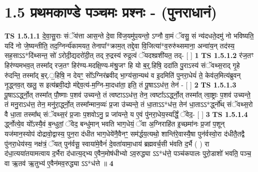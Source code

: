 \documentclass[17pt]{extarticle}
\begin{document}
     \section*{ 1.5     प्रथमकाण्डे पञ्चमः प्रश्नः - (पुनराधानं) }
                                        \textbf{ TS 1.5.1.1} \newline
                  दे॒वा॒सु॒राः संॅय॑त्ता आस॒न्ते दे॒वा वि॑ज॒यमु॑प॒यन्तो॒ ऽग्नौ वा॒मं ॅवसु॒ सं न्य॑दधते॒दमु॑ नो भविष्यति॒ यदि॑ नो जे॒ष्यन्तीति॒ तद॒ग्निर्न्य॑कामयत॒ तेनापा᳚*क्राम॒त् तद्दे॒वा वि॒जित्या॑*व॒रुरु॑थ्समाना॒ अन्वा॑य॒न् तद॑स्य॒ सह॒साऽऽ*दि॑थ्सन्त॒ सो॑ ऽरोदी॒द्यदरो॑दी॒त् तद् रु॒द्रस्य॑ रुद्र॒त्वं ॅयदश्व्रशी॑यत॒ तद्- [ ] \textbf{  1} \newline
                  \newline
                                \textbf{ TS 1.5.1.2} \newline
                  र॑ज॒तꣳ हिर॑ण्यमभव॒त् तस्मा᳚द् रज॒तꣳ हिर॑ण्य-मदक्षि॒ण्य-म॑श्रु॒जꣳ हि यो ब॒र्॒.हिषि॒ ददा॑ति पु॒राऽस्य॑ संॅवथ्स॒राद् गृ॒हे रु॑दन्ति॒ तस्मा᳚द् ब॒र्.॒हिषि॒ न देयꣳ॒॒ सो᳚ऽग्निर॑ब्रवीद् भा॒ग्य॑सा॒न्यथ॑ व इ॒दमिति॑ पुनरा॒धेयं॑ ते॒ केव॑ल॒मित्य॑ब्रुवन् नृ॒द्ध्नव॒त् खलु॒ स इत्य॑ब्रवी॒द्यो म॑द्देव॒त्य॑-म॒ग्नि-मा॒दधा॑ता॒ इति॒ तं पू॒षाऽऽध॑त्त॒ तेन॑ - [ ] \textbf{  2} \newline
                  \newline
                                \textbf{ TS 1.5.1.3} \newline
                  पू॒षाऽऽर्द्ध्नो॒त् तस्मा᳚त् पौ॒ष्णाः प॒शव॑ उच्यन्ते॒ तं त्वष्टाऽऽध॑त्त॒ तेन॒ त्वष्टा᳚ऽऽर्द्ध्नो॒त् तस्मा᳚त् त्वा॒ष्ट्राः प॒शव॑ उच्यन्ते॒ तं मनु॒राऽध॑त्त॒ तेन॒ मनु॑रा॒र्द्ध्नो॒त् तस्मा᳚न्मान॒व्यः॑ प्र॒जा उ॑च्यन्ते॒ तं धा॒ताऽऽ*ध॑त्त॒ तेन॑ धा॒ताऽऽ*र्द्ध्नो᳚थ् संॅवथ्स॒रो वै धा॒ता तस्मा᳚थ् संॅवथ्स॒रं प्र॒जाः प॒शवोऽनु॒ प्र जा॑यन्ते॒ य ए॒वं पु॑नरा॒धेय॒स्यर्द्धिं॒ ॅवेद॒- [ ] \textbf{  3 } \newline
                  \newline
                                \textbf{ TS 1.5.1.4} \newline
                  र्द्ध्नोत्ये॒व यो᳚ऽस्यै॒वं ब॒न्धुतां॒ ॅवेद॒ बन्धु॑मान् भवति भाग॒धेयं॒ ॅवा अ॒ग्निराहि॑त इ॒च्छमा॑नः प्र॒जां प॒शून् यज॑मान॒स्योप॑ दोद्रावो॒द्वास्य॒ पुन॒रा द॑धीत भाग॒धेये॑नै॒वैनꣳ॒॒ सम॑र्द्धय॒त्यथो॒ शान्ति॑रे॒वास्यै॒षा पुन॑र्वस्वो॒रा द॑धीतै॒तद्वै पु॑नरा॒धेय॑स्य॒ नक्ष॑त्रं॒ ॅयत् पुन॑र्वसू॒ स्वाया॑मे॒वैनं॑ दे॒वता॑यामा॒धाय॑ ब्रह्मवर्च॒सी भ॑वति द॒र्भै ( ) रा द॑धा॒त्यया॑तयामत्वाय द॒र्भैरा द॑धात्य॒द्भ्य ए॒वैन॒मोष॑धीभ्यो ऽव॒रुद्ध्या ऽऽ*ध॑त्ते॒ पञ्च॑कपालः पुरो॒डाशो॑ भवति॒ पञ्च॒ वा ऋ॒तव॑ ऋ॒तुभ्य॑ ए॒वैन॑मव॒रुद्ध्या ऽऽ*ध॑त्ते ॥ \textbf{  4} \newline
\end{document}
